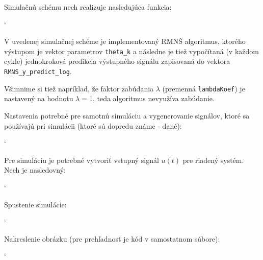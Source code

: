 \documentclass[a4paper, 10pt, ]{article}
\begin{document}
\bigskip




\noindent
Simulačnú schému nech realizuje nasledujúca funkcia:

{\catcode`

}


V uvedenej simulačnej schéme je implementovaný RMNŠ algoritmus, ktorého výstupom je vektor parametrov \lstinline{theta_k} a následne je tiež vypočítaná (v každom cykle) jednokroková predikcia výstupného signálu zapisovaná do vektora \lstinline{RMNS_y_predict_log}.

Všimnime si tiež napríklad, že faktor zabúdania $\lambda$ (premenná \lstinline{lambdaKoef}) je nastavený na hodnotu $\lambda = 1$, teda algoritmus nevyužíva zabúdanie.

Nastavenia potrebné pre samotnú simuláciu a vygenerovanie signálov, ktoré sa používajú pri simulácii (ktoré sú dopredu známe - dané):


{\catcode`

}

\noindent
Pre simuláciu je potrebné vytvoriť vstupný signál $u(t)$ pre riadený systém. Nech je nasledovný:

{\catcode`

}


\noindent
Spustenie simulácie:

{\catcode`

}


\noindent
Nakreslenie obrázku (pre prehľadnosť je kód v samostatnom súbore):


{\catcode`

}
\end{document}
